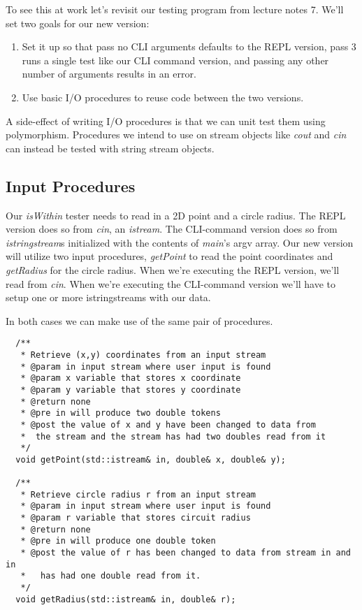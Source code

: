 \documentclass[]{tufte-handout}
\begin{document}
To see this at work let's revisit our testing program from lecture notes 7. We'll set two goals for our new version:
\begin{enumerate}
\item Set it up so that pass no CLI arguments defaults to the REPL version, pass 3 runs a single test like our CLI command version, and passing any other number of arguments results in an error.

\item Use basic I/O procedures to reuse code between the two versions.
\end{enumerate}
A side-effect of writing I/O procedures is that we can unit test them using polymorphism.  Procedures we intend to use on stream objects like \textit{cout} and \textit{cin} can instead be tested with string stream objects.

\subsection{Input Procedures}

Our \textit{isWithin} tester needs to read in a 2D point and a circle radius.  The REPL version does so from \textit{cin}, an \textit{istream}.  The CLI-command version does so from \textit{istringstream}s initialized with the contents of \textit{main}'s argv array. Our new version will utilize two input procedures, \textit{getPoint} to read the point coordinates and \textit{getRadius} for the circle radius. When we're executing the REPL version, we'll read from \textit{cin}. When we're executing the CLI-command version we'll have to setup one or more istringstreams with our data. 

In both cases we can make use of the same pair of procedures.
\begin{verbatim}
  /**
   * Retrieve (x,y) coordinates from an input stream
   * @param in input stream where user input is found
   * @param x variable that stores x coordinate
   * @param y variable that stores y coordinate
   * @return none
   * @pre in will produce two double tokens
   * @post the value of x and y have been changed to data from
   *  the stream and the stream has had two doubles read from it
   */
  void getPoint(std::istream& in, double& x, double& y);

  /**
   * Retrieve circle radius r from an input stream
   * @param in input stream where user input is found
   * @param r variable that stores circuit radius
   * @return none
   * @pre in will produce one double token
   * @post the value of r has been changed to data from stream in and in
   *   has had one double read from it.
   */
  void getRadius(std::istream& in, double& r);
\end{verbatim}
\end{document}
